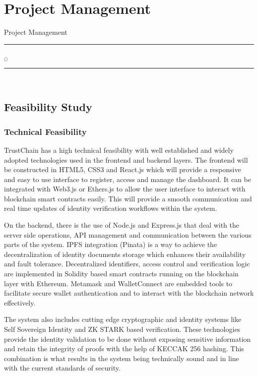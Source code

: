 \chapter[Project Management]{Project Management}{Project Management}\label{projm}


\rule{0.49\textwidth}{0.75pt} $_{\bigcirc}$ \rule{0.49\textwidth}{0.75pt}\\





\section{Feasibility Study}

\subsection{Technical Feasibility}
TrustChain has a high technical feasibility with well established and widely adopted technologies used in the frontend and backend layers. The frontend will be constructed in HTML5, CSS3 and React.js which will provide a responsive and easy to use interface to register, access and manage the dashboard. It can be integrated with Web3.js or Ethers.js to allow the user interface to interact with blockchain smart contracts easily. This will provide a smooth communication and real time updates of identity verification workflows within the system.

On the backend, there is the use of Node.js and Express.js that deal with the server side operations, API management and communication between the various parts of the system. IPFS integration (Pinata) is a way to achieve the decentralization of identity documents storage which enhances their availability and fault tolerance. Decentralized identifiers, access control and verification logic are implemented in Solidity based smart contracts running on the blockchain layer with Ethereum. Metamask and WalletConnect are embedded tools to facilitate secure wallet authentication and to interact with the blockchain network effectively.

The system also includes cutting edge cryptographic and identity systems like Self Sovereign Identity and ZK STARK based verification. These technologies provide the identity validation to be done without exposing sensitive information and retain the integrity of proofs with the help of KECCAK 256 hashing. This combination is what results in the system being technically sound and in line with the current standards of security.


